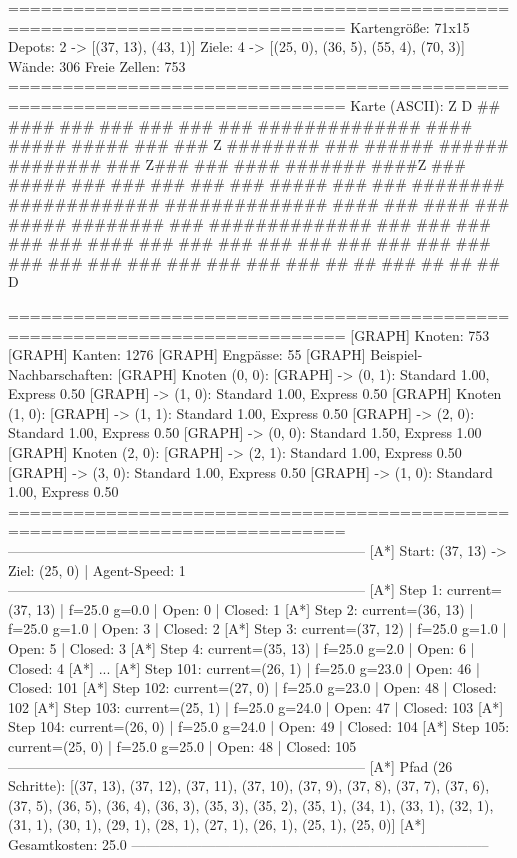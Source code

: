 =============================================================================
Kartengröße:           71x15
Depots:                2 -> [(37, 13), (43, 1)]
Ziele:                 4 -> [(25, 0), (36, 5), (55, 4), (70, 3)]
Wände:                 306
Freie Zellen:          753
=============================================================================
Karte (ASCII):
                         Z
                                           D
   ##       ####     ###       ###     ###         ###  ###
  ##############     ####     #####    #####       ###  ###           Z
  ########   ###    ######   ######    ########    ### Z###
  ###              #### ####### ####Z  ###  #####  ###  ###      ###
  ###              ###   #####   ###   ###    ########  #############
  ##############  ####    ###    ####  ###       #####  ########  ###
  ##############          ###          ###         ###  ###       ###
  ####       ###          ###          ###              ###       ###
  ###        ###          ###          ###              ###       ###
  ###        ###          ###          ###              ###       ###
   ##         ##          ###           ##              ##         ##
                                     D

=============================================================================
[GRAPH]    Knoten:              753
[GRAPH]    Kanten:              1276
[GRAPH]    Engpässe:            55
[GRAPH]    Beispiel-Nachbarschaften:
[GRAPH]      Knoten (0, 0):
[GRAPH]        -> (0, 1): Standard 1.00, Express 0.50
[GRAPH]        -> (1, 0): Standard 1.00, Express 0.50
[GRAPH]      Knoten (1, 0):
[GRAPH]        -> (1, 1): Standard 1.00, Express 0.50
[GRAPH]        -> (2, 0): Standard 1.00, Express 0.50
[GRAPH]        -> (0, 0): Standard 1.50, Express 1.00
[GRAPH]      Knoten (2, 0):
[GRAPH]        -> (2, 1): Standard 1.00, Express 0.50
[GRAPH]        -> (3, 0): Standard 1.00, Express 0.50
[GRAPH]        -> (1, 0): Standard 1.00, Express 0.50
=============================================================================
-----------------------------------------------------------------------------
[A*] Start: (37, 13) -> Ziel: (25, 0) | Agent-Speed: 1
-----------------------------------------------------------------------------
[A*] Step   1: current=(37, 13) | f=25.0 g=0.0 | Open: 0 | Closed: 1
[A*] Step   2: current=(36, 13) | f=25.0 g=1.0 | Open: 3 | Closed: 2
[A*] Step   3: current=(37, 12) | f=25.0 g=1.0 | Open: 5 | Closed: 3
[A*] Step   4: current=(35, 13) | f=25.0 g=2.0 | Open: 6 | Closed: 4
[A*]   ...
[A*] Step 101: current=(26, 1) | f=25.0 g=23.0 | Open: 46 | Closed: 101
[A*] Step 102: current=(27, 0) | f=25.0 g=23.0 | Open: 48 | Closed: 102
[A*] Step 103: current=(25, 1) | f=25.0 g=24.0 | Open: 47 | Closed: 103
[A*] Step 104: current=(26, 0) | f=25.0 g=24.0 | Open: 49 | Closed: 104
[A*] Step 105: current=(25, 0) | f=25.0 g=25.0 | Open: 48 | Closed: 105
-----------------------------------------------------------------------------
[A*] Pfad (26 Schritte): [(37, 13), (37, 12), (37, 11), (37, 10), (37, 9), 
(37, 8), (37, 7), (37, 6), (37, 5), (36, 5), (36, 4), (36, 3), (35, 3), 
(35, 2), (35, 1), (34, 1), (33, 1), (32, 1), (31, 1), (30, 1), (29, 1), 
(28, 1), (27, 1), (26, 1), (25, 1), (25, 0)]
[A*] Gesamtkosten: 25.0
-----------------------------------------------------------------------------